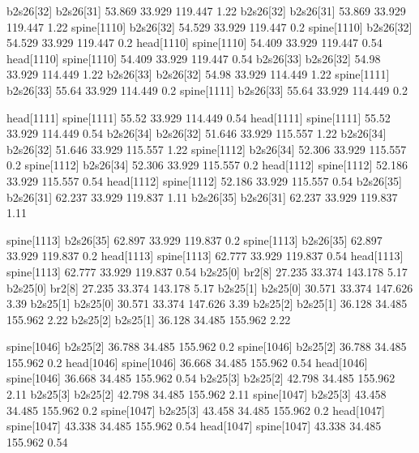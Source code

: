 b2s26[32]    b2s26[31]    53.869    33.929    119.447    1.22
b2s26[32]    b2s26[31]    53.869    33.929    119.447    1.22
spine[1110]    b2s26[32]    54.529    33.929    119.447    0.2
spine[1110]    b2s26[32]    54.529    33.929    119.447    0.2
head[1110]    spine[1110]    54.409    33.929    119.447    0.54
head[1110]    spine[1110]    54.409    33.929    119.447    0.54
b2s26[33]    b2s26[32]    54.98    33.929    114.449    1.22
b2s26[33]    b2s26[32]    54.98    33.929    114.449    1.22
spine[1111]    b2s26[33]    55.64    33.929    114.449    0.2
spine[1111]    b2s26[33]    55.64    33.929    114.449    0.2


head[1111]    spine[1111]    55.52    33.929    114.449    0.54
head[1111]    spine[1111]    55.52    33.929    114.449    0.54
b2s26[34]    b2s26[32]    51.646    33.929    115.557    1.22
b2s26[34]    b2s26[32]    51.646    33.929    115.557    1.22
spine[1112]    b2s26[34]    52.306    33.929    115.557    0.2
spine[1112]    b2s26[34]    52.306    33.929    115.557    0.2
head[1112]    spine[1112]    52.186    33.929    115.557    0.54
head[1112]    spine[1112]    52.186    33.929    115.557    0.54
b2s26[35]    b2s26[31]    62.237    33.929    119.837    1.11
b2s26[35]    b2s26[31]    62.237    33.929    119.837    1.11


spine[1113]    b2s26[35]    62.897    33.929    119.837    0.2
spine[1113]    b2s26[35]    62.897    33.929    119.837    0.2
head[1113]    spine[1113]    62.777    33.929    119.837    0.54
head[1113]    spine[1113]    62.777    33.929    119.837    0.54
b2s25[0]    br2[8]    27.235    33.374    143.178    5.17
b2s25[0]    br2[8]    27.235    33.374    143.178    5.17
b2s25[1]    b2s25[0]    30.571    33.374    147.626    3.39
b2s25[1]    b2s25[0]    30.571    33.374    147.626    3.39
b2s25[2]    b2s25[1]    36.128    34.485    155.962    2.22
b2s25[2]    b2s25[1]    36.128    34.485    155.962    2.22


spine[1046]    b2s25[2]    36.788    34.485    155.962    0.2
spine[1046]    b2s25[2]    36.788    34.485    155.962    0.2
head[1046]    spine[1046]    36.668    34.485    155.962    0.54
head[1046]    spine[1046]    36.668    34.485    155.962    0.54
b2s25[3]    b2s25[2]    42.798    34.485    155.962    2.11
b2s25[3]    b2s25[2]    42.798    34.485    155.962    2.11
spine[1047]    b2s25[3]    43.458    34.485    155.962    0.2
spine[1047]    b2s25[3]    43.458    34.485    155.962    0.2
head[1047]    spine[1047]    43.338    34.485    155.962    0.54
head[1047]    spine[1047]    43.338    34.485    155.962    0.54


